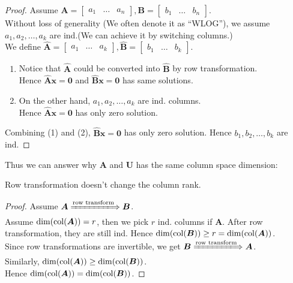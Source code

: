 \begin{proof}
Assume $\bm A = \left[\begin{array}{c|c|c}
a_1&\dots&a_n
\end{array}\right], \bm B = \left[\begin{array}{c|c|c}
b_1&\dots&b_n
\end{array}\right]$.\\
Without loss of generality (We often denote it as ``WLOG''), we assume $a_1,a_2,\dots,a_k$ are ind.(We can achieve it by switching columns.)\\
We define $\bm{\hat{A}} = \left[\begin{array}{c|c|c}
a_1&\dots&a_k
\end{array}\right],\bm{\hat{B}} = \left[\begin{array}{c|c|c}
b_1&\dots&b_k
\end{array}\right]$.\\
\begin{enumerate}
\item
Notice that $\bm{\hat{A}}$ could be converted into $\bm{\hat{B}}$ by row transformation.\\
Hence $\bm{\hat{A}x}=\bm 0$ and $\bm{\hat{B}x}=\bm 0$ has same solutions.
\item
On the other hand, $a_1,a_2,\dots,a_k$ are ind. columns.\\
Hence $\bm{\hat{A}x}=\bm 0$ has only zero solution.
\end{enumerate}
Combining (1) and (2), $\bm{\hat{B}x}=\bm 0$ has only zero solution. Hence $b_1,b_2,\dots,b_k$ are ind.
\end{proof}
\newpage
Thus we can answer why $\bm A$ and $\bm U$ has the same column space dimension:
\begin{proposition}\label{column_rank}
Row transformation doesn't change the column rank.
\end{proposition}
\begin{proof}
Assume $\bm A\xLongrightarrow{\text{row transform}}\bm B$.\\
Assume $\dim(\operatorname{col}(\bm A)) = r$, then we pick $r$ ind. columns if $\bm A$. After row transformation, they are still ind. Hence $\dim(\operatorname{col}(\bm B))\ge r = \dim(\operatorname{col}(\bm A))$.\\
Since row transformations are invertible, we get $\bm B\xLongrightarrow{\text{row transform}}\bm A$.\\ Similarly, $\dim(\operatorname{col}(\bm A))\ge \dim(\operatorname{col}(\bm B))$.\\
Hence $\dim(\operatorname{col}(\bm A))= \dim(\operatorname{col}(\bm B))$.
\end{proof}
